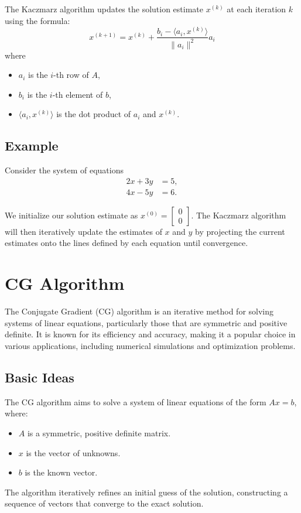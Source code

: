 \documentclass{article}
\begin{document}
The Kaczmarz algorithm updates the solution estimate \(x^{(k)}\) at each iteration \(k\) using the formula:
\[
x^{(k+1)} = x^{(k)} + \frac{b_i - \langle a_i, x^{(k)} \rangle}{\|a_i\|^2} a_i
\]
where
\begin{itemize}
    \item \(a_i\) is the \(i\)-th row of \(A\),
    \item \(b_i\) is the \(i\)-th element of \(b\),
    \item \(\langle a_i, x^{(k)} \rangle\) is the dot product of \(a_i\) and \(x^{(k)}\).
\end{itemize}

\subsection{Example}
Consider the system of equations
\[
\begin{aligned}
2x + 3y &= 5, \\
4x - 5y &= 6.
\end{aligned}
\]

We initialize our solution estimate as \(x^{(0)} = \begin{bmatrix} 0 \\ 0 \end{bmatrix}\). The Kaczmarz algorithm will then iteratively update the estimates of \(x\) and \(y\) by projecting the current estimates onto the lines defined by each equation until convergence.

\section{CG Algorithm}
The Conjugate Gradient (CG) algorithm is an iterative method for solving systems of linear equations, particularly those that are symmetric and positive definite. It is known for its efficiency and accuracy, making it a popular choice in various applications, including numerical simulations and optimization problems.

\subsection{Basic Ideas}
The CG algorithm aims to solve a system of linear equations of the form $Ax = b$, where:
\begin{itemize}
    \item $A$ is a symmetric, positive definite matrix.
    \item $x$ is the vector of unknowns.
    \item $b$ is the known vector.
\end{itemize}
The algorithm iteratively refines an initial guess of the solution, constructing a sequence of vectors that converge to the exact solution.
\end{document}
